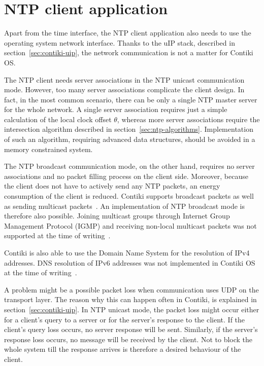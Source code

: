 
\section{NTP client application}\label{sec:analysis-application}
Apart from the time interface, the NTP client application
also needs to use the operating system network interface.
Thanks to the uIP stack, described in section~\ref{sec:contiki-uip},
the network communication is not a matter for Contiki OS.

The NTP client needs server associations in the NTP unicast communication mode.
However, too many server associations complicate the client design.
In fact, in the most common scenario, there can be only a single NTP master server
for the whole network.
A single server association requires just a simple calculation of the local clock offset
$\theta$, whereas more server associations require the intersection algorithm
described in section~\ref{sec:ntp-algorithms}.
Implementation of such an algorithm, requiring advanced data structures, should be avoided
in a memory constrained system.

The NTP broadcast communication mode, on the other hand,
requires no server associations and no packet filling process on the client side.
Moreover, because the client does not have to actively send any NTP packets,
an energy consumption of the client is reduced.
Contiki supports broadcast packets as well as sending multicast packets~\cite{contiki-docs}.
An implementation of NTP broadcast mode is therefore also possible.
Joining multicast groups through Internet Group Management Protocol (IGMP)
and receiving non-local multicast packets
was not supported at the time of writing~\cite{contiki-docs}.

Contiki is also able to use the Domain Name System for the resolution of IPv4 addresses.
DNS resolution of IPv6 addresses was not implemented in Contiki OS
at the time of writing~\cite{contiki-docs}.

A problem might be a possible packet loss when communication uses UDP on the transport layer.
The reason why this can happen often in Contiki, is explained in section~\ref{sec:contiki-uip}.
In NTP unicast mode, the packet loss might occur either for a client's query to a server
or for the server's response to the client.
If the client's query loss occurs, no server response will be sent.
Similarly, if the server's response loss occurs, no message will be received by the client.
Not to block the whole system till the response arrives
is therefore a desired behaviour of the client.

